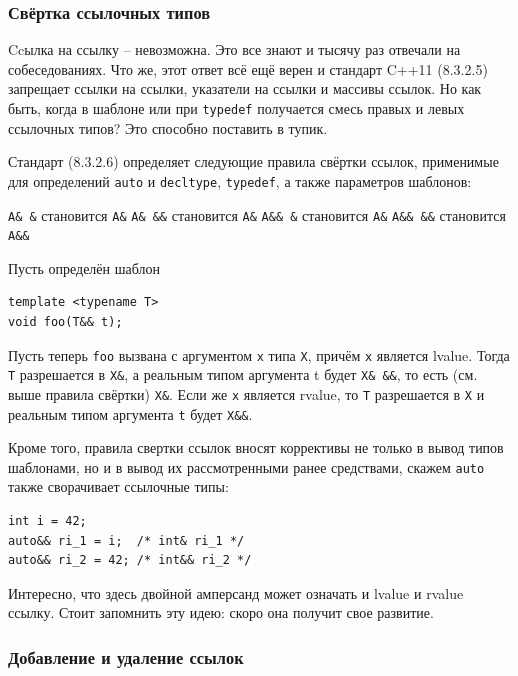 \documentclass[a4paper,12pt,oneside]{article}
\newif\ifanswers
\begin{document}
\ifanswers
Правильный ответ: dangling rvalue reference.
\fi

\subsubsection{Свёртка ссылочных типов}\label{ReferenceConvolution}

Ccылка на ссылку -- невозможна. Это все знают и тысячу раз отвечали на собеседованиях. Что же, этот ответ всё ещё верен и стандарт C++11 (8.3.2.5) запрещает ссылки на ссылки, указатели на ссылки и массивы ссылок. Но как быть, когда в шаблоне или при \lstinline!typedef! получается смесь правых и левых ссылочных типов? Это способно поставить в тупик.

Стандарт (8.3.2.6) определяет следующие правила свёртки ссылок, применимые для определений \lstinline!auto! и \lstinline!decltype!, \lstinline!typedef!, а также параметров шаблонов:

\lstinline!A& &! становится \lstinline!A&!
\lstinline!A& &&! становится \lstinline!A&!
\lstinline!A&& &! становится \lstinline!A&!
\lstinline!A&& &&! становится \lstinline!A&&!

Пусть определён шаблон

\begin{lstlisting}
template <typename T>
void foo(T&& t);
\end{lstlisting}

Пусть теперь \lstinline!foo! вызвана с аргументом \lstinline!x! типа \lstinline!X!, причём \lstinline!x! является lvalue. Тогда \lstinline!T! разрешается в \lstinline!X&!, а реальным типом аргумента t будет \lstinline!X& &&!, то есть (см. выше правила свёртки) \lstinline!X&!. Если же \lstinline!x! является rvalue, то \lstinline!T! разрешается в \lstinline!X! и реальным типом аргумента \lstinline!t! будет \lstinline!X&&!.

Кроме того, правила свертки ссылок вносят коррективы не только в вывод типов шаблонами, но и в вывод их рассмотренными ранее средствами, скажем  \lstinline!auto! также сворачивает ссылочные типы:

\begin{lstlisting}
int i = 42;
auto&& ri_1 = i;  /* int& ri_1 */
auto&& ri_2 = 42; /* int&& ri_2 */
\end{lstlisting}

Интересно, что здесь двойной амперсанд может означать и lvalue и rvalue ссылку. Стоит запомнить эту идею: скоро она получит свое развитие.

\subsubsection{Добавление и удаление ссылок}
\end{document}
